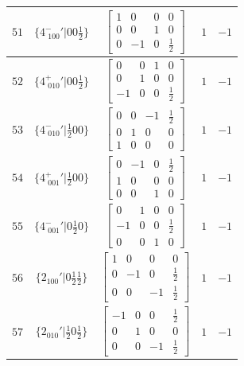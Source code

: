 \documentclass[fleqn,8pt]{jsarticle}
\begin{document}
\begin{longtable}{ccccc}
$ 51 $ & $ \{4^{-}_{\,\,100}{}'|0 0 \frac{1}{2}\} $ & $ \begin{bmatrix} 1 & 0 & 0 & 0 \\ 0 & 0 & 1 & 0 \\ 0 & -1 & 0 & \frac{1}{2} \end{bmatrix} $ & $ 1 $ & $ -1 $ \\ \hline
$ 52 $ & $ \{4^{+}_{\,\,010}{}'|0 0 \frac{1}{2}\} $ & $ \begin{bmatrix} 0 & 0 & 1 & 0 \\ 0 & 1 & 0 & 0 \\ -1 & 0 & 0 & \frac{1}{2} \end{bmatrix} $ & $ 1 $ & $ -1 $ \\ \hline
$ 53 $ & $ \{4^{-}_{\,\,010}{}'|\frac{1}{2} 0 0\} $ & $ \begin{bmatrix} 0 & 0 & -1 & \frac{1}{2} \\ 0 & 1 & 0 & 0 \\ 1 & 0 & 0 & 0 \end{bmatrix} $ & $ 1 $ & $ -1 $ \\ \hline
$ 54 $ & $ \{4^{+}_{\,\,001}{}'|\frac{1}{2} 0 0\} $ & $ \begin{bmatrix} 0 & -1 & 0 & \frac{1}{2} \\ 1 & 0 & 0 & 0 \\ 0 & 0 & 1 & 0 \end{bmatrix} $ & $ 1 $ & $ -1 $ \\ \hline
$ 55 $ & $ \{4^{-}_{\,\,001}{}'|0 \frac{1}{2} 0\} $ & $ \begin{bmatrix} 0 & 1 & 0 & 0 \\ -1 & 0 & 0 & \frac{1}{2} \\ 0 & 0 & 1 & 0 \end{bmatrix} $ & $ 1 $ & $ -1 $ \\ \hline
$ 56 $ & $ \{2{}_{100}{}'|0 \frac{1}{2} \frac{1}{2}\} $ & $ \begin{bmatrix} 1 & 0 & 0 & 0 \\ 0 & -1 & 0 & \frac{1}{2} \\ 0 & 0 & -1 & \frac{1}{2} \end{bmatrix} $ & $ 1 $ & $ -1 $ \\ \hline
$ 57 $ & $ \{2{}_{010}{}'|\frac{1}{2} 0 \frac{1}{2}\} $ & $ \begin{bmatrix} -1 & 0 & 0 & \frac{1}{2} \\ 0 & 1 & 0 & 0 \\ 0 & 0 & -1 & \frac{1}{2} \end{bmatrix} $ & $ 1 $ & $ -1 $ \\ \hline

\end{longtable}
\end{document}
